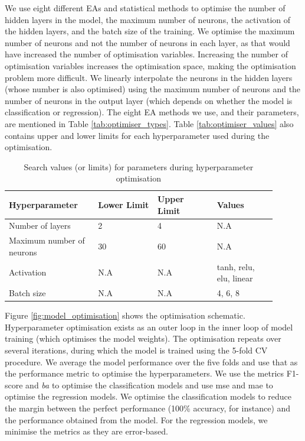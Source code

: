 We use eight different EAs and statistical methods to optimise the number of hidden layers in the model, the maximum number of neurons, the activation of the hidden layers, and the batch size of the training. We optimise the maximum number of neurons and not the number of neurons in each layer, as that would have increased the number of optimisation variables. Increasing the number of optimisation variables increases the optimisation space, making the optimisation problem more difficult. We linearly interpolate the neurons in the hidden layers (whose number is also optimised) using the maximum number of neurons and the number of neurons in the output layer (which depends on whether the model is classification or regression). The eight EA methods we use, and their parameters, are mentioned in Table \ref{tab:optimiser_types}. Table \ref{tab:optimiser_values} also contains upper and lower limits for each hyperparameter used during the optimisation.



\begin{table}[htbp] 
 \caption{Search values (or limits) for parameters during hyperparameter optimisation}
 \begin{tabular}{p{0.3\linewidth}p{0.2\linewidth}p{0.2\linewidth}p{0.2\linewidth}}
 \toprule
 \textbf{Hyperparameter} & \textbf{Lower Limit} & \textbf{Upper Limit} & \textbf{Values}\\
 \midrule
 Number of layers & 2 & 4 & N.A\\
 Maximum number of neurons & 30 & 60 & N.A \\
 Activation & N.A & N.A & \gls{tanh}, \gls{relu}, \gls{elu}, linear\\
 Batch size & N.A & N.A & 4, 6, 8 \\
 \bottomrule
 \end{tabular}
 \label{tab:monolithic_optimiser_values}
\end{table}



Figure \ref{fig:model_optimisation} shows the optimisation schematic. Hyperparameter optimisation exists as an outer loop in the inner loop of model training (which optimises the model weights). The optimisation repeats over several iterations, during which the model is trained using the 5-fold CV procedure. We average the model performance over the five folds and use that as the performance metric to optimise the hyperparameters. We use the metrics F1-score and \emph{\gls{ba}} to optimise the classification models and use \gls{mse} and \gls{mae} to optimise the regression models. We optimise the classification models to reduce the margin between the perfect performance (100\% accuracy, for instance) and the performance obtained from the model. For the regression models, we minimise the metrics as they are error-based.


